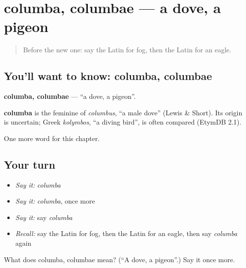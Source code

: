 \section[columba, columbae]{columba, columbae — a dove, a pigeon}

\label{lesson:LA-C131-columba}



\begin{quote}
Before the new one: say the Latin for fog, then the Latin for an eagle.
\end{quote}

\subsection*{You'll want to know: columba, columbae}
\textbf{columba, columbae} — \textquotedblleft{}a dove, a pigeon\textquotedblright{}.

\begin{cousinweb}
\textbf{columba} is the feminine of \emph{columbus}, \textquotedblleft{}a male dove\textquotedblright{} (Lewis \& Short). Its origin is uncertain; Greek \emph{kolymbos}, \textquotedblleft{}a diving bird\textquotedblright{}, is often compared (EtymDB 2.1).
\end{cousinweb}

\begin{grammarlens}[title={What you've built}]
One more word for this chapter.
\end{grammarlens}

\subsection*{Your turn}
\begin{itemize}
\raggedright
  \item \emph{Say it:} \emph{columba}
  \item \emph{Say it:} \emph{columba}, once more
  \item \emph{Say it:} say \emph{columba}
  \item \emph{Recall:} say the Latin for fog, then the Latin for an eagle, then say \emph{columba} again
\end{itemize}

\begin{tcolorbox}[breakable,colback=teal!4,colframe=teal!35!black,title={Before you move on}]
What does columba, columbae mean? (\textquotedblleft{}A dove, a pigeon\textquotedblright{}.) Say it once more.
\end{tcolorbox}

